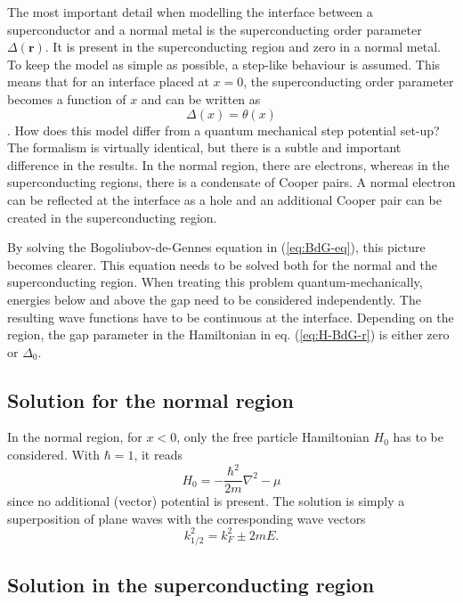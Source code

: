 The most important detail when modelling the interface between a superconductor and a normal metal is the superconducting order parameter $\Delta \left( \mathbf{r} \right)$. It is present in the superconducting region and zero in a normal metal. To keep the model as simple as possible, a step-like behaviour is assumed. This means that for an interface placed at $x=0$, the superconducting order parameter becomes a function of $x$ and can be written as
\begin{equation}
\Delta \left( x \right) = \theta \left(x \right)
\end{equation}.
How does this model differ from a quantum mechanical step potential set-up? The formalism is virtually identical, but there is a subtle and important difference in the results. In the normal region, there are electrons, whereas in the superconducting regions, there is a condensate of Cooper pairs. A normal electron can be reflected at the interface as a hole and an additional Cooper pair can be created in the superconducting region.

By solving the Bogoliubov-de-Gennes equation in (\ref{eq:BdG-eq}), this picture becomes clearer.  This equation needs to be solved both for the normal and the superconducting region. When treating this problem quantum-mechanically, energies below and above the gap need to be considered independently. The resulting wave functions have to be continuous at the interface. Depending on the region, the gap parameter in the Hamiltonian in eq. (\ref{eq:H-BdG-r}) is either zero or $\Delta_0$.

\subsection{Solution for the normal region}\label{sec:normal-region}
In the normal region, for $x < 0$, only the free particle Hamiltonian $H_0$ has to be considered. With $\hbar = 1$, it reads
\begin{equation}
H_0 = - \frac{\hbar^2}{2m} \nabla^2 - \mu 
\end{equation}
since no additional (vector) potential is present. The solution is simply a superposition of plane waves with the corresponding wave vectors
\begin{equation}
k_{1/2}^2 = k_F^2 \pm 2mE \label{eq:k-normal}.
\end{equation}

\subsection{Solution in the superconducting region}
 
